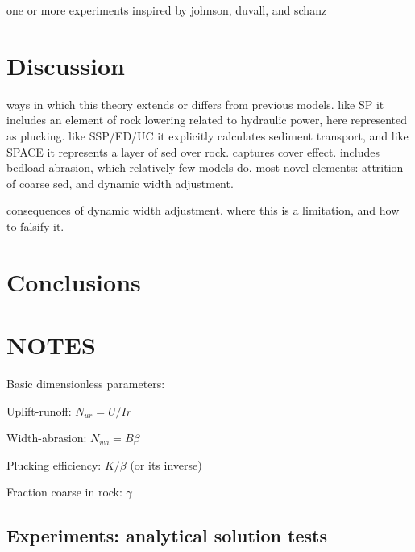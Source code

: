 \documentclass[journal abbreviation, manuscript]{copernicus}
\begin{document}
one or more experiments inspired by johnson, duvall, and schanz

\section{Discussion}

ways in which this theory extends or differs from previous models. like SP it includes an element of rock lowering related to hydraulic power, here represented as plucking. like SSP/ED/UC it explicitly calculates sediment transport, and like SPACE it represents a layer of sed over rock. captures cover effect. includes bedload abrasion, which relatively few models do. most novel elements: attrition of coarse sed, and dynamic width adjustment.

consequences of dynamic width adjustment. where this is a limitation, and how to falsify it.




\section{Conclusions}




\codeavailability



\authorcontribution{}



\begin{acknowledgements}
\end{acknowledgements}




\section*{NOTES}

Basic dimensionless parameters:

Uplift-runoff: $N_{ur} = U / I r$

Width-abrasion: $N_{wa} = B\beta$

Plucking efficiency: $K/\beta$ (or its inverse)

Fraction coarse in rock: $\gamma$


\subsection*{Experiments: analytical solution tests}
\end{document}
